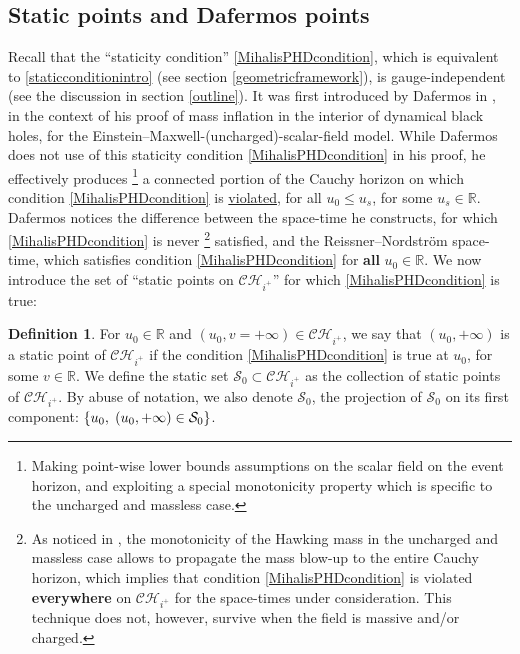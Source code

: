 \documentclass[10pt,a4paper]{article}
\theoremstyle{plain}
\theoremstyle{remark}
\theoremstyle{definition}
\newtheorem{defn}{Definition}[section]
\newcommand{\RR}{\mathbb{R}}
\theoremstyle{plain}
\theoremstyle{remark}
\theoremstyle{definition}
\newcommand{\CH}{\mathcal{CH}_{i^+}}
\numberwithin{equation}{section}
\begin{document}
\subsection{Static points and Dafermos points} \label{classificationsection1}

Recall that the ``staticity condition'' \eqref{MihalisPHDcondition}, which is equivalent to \eqref{staticconditionintro} (see section \ref{geometricframework}), is gauge-independent (see the discussion in section \ref{outline}). It was first introduced by Dafermos in \cite{MihalisPHD}, in the context of his proof of mass inflation in the interior of dynamical black holes, for the Einstein--Maxwell-(uncharged)-scalar-field model. While Dafermos does not use of this staticity condition \eqref{MihalisPHDcondition} in his proof, he effectively produces \footnote{Making point-wise lower bounds assumptions on the scalar field on the event horizon, and exploiting a special monotonicity property which is specific to the uncharged and massless case.} a connected portion of the Cauchy horizon on which condition \eqref{MihalisPHDcondition} is \underline{violated}, for all $u_0 \leq u_s$, for some $u_s \in \RR$. Dafermos notices the difference between the space-time he constructs, for which \eqref{MihalisPHDcondition} is never \footnote{As noticed in \cite{Mihalisnospacelike}, the monotonicity of the Hawking mass in the uncharged and massless case allows to propagate the mass blow-up to the entire Cauchy horizon, which implies that condition \eqref{MihalisPHDcondition} is violated \textbf{everywhere} on $\CH$ for the space-times under consideration. This technique does not, however, survive when the field is massive and/or charged.} satisfied, and the Reissner--Nordstr\"{o}m space-time,  which satisfies condition \eqref{MihalisPHDcondition} for \textbf{all} $u_0 \in \RR$. We now introduce the set of ``static points on $\CH$'' for which \eqref{MihalisPHDcondition} is true:

\begin{defn} For $u_0 \in \RR$ and $(u_0,v=+\infty) \in \CH$, we say that $(u_0,+\infty)$ is a static point of $\CH$ if the condition \eqref{MihalisPHDcondition} is true at $u_0$, for some $v \in \RR$. We define the static set $\mathcal{S}_0 \subset \CH$ as the collection of static points of $\CH$. By abuse of notation, we also denote $\mathcal{S}_0$, the projection of $\mathcal{S}_0$ on its first component:  $\{ u_0, \hskip 1 mm(u_0,+\infty) \in \mathcal{S}_0 \}$.
\end{defn}
\end{document}
